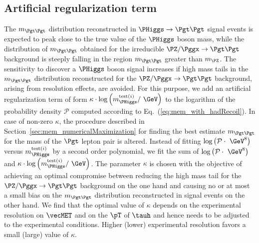 \subsection{Artificial regularization term}
\label{sec:mem_logM}

The $m_{\Pgt\Pgt}$ distribution reconstructed in $\PHiggs \to \Pgt\Pgt$ signal events is expected to peak close to the true value of the $\PHiggs$ boson mass,
while the distribution of $m_{\Pgt\Pgt}$ obtained for the irreducible
$\PZ/\Pggx \to \Pgt\Pgt$ background is steeply falling in the region
$m_{\Pgt\Pgt}$ greater than $m_{\PZ}$.
The sensitivity to discover a $\PHiggs$ boson signal increases if high mass tails in the $m_{\Pgt\Pgt}$ distribution reconstructed 
for the $\PZ/\Pggx \to \Pgt\Pgt$ background, arising from resolution effects, are avoided.
For this purpose,
we add an artificial regularization term of form 
$\kappa \cdot \log \left( m_{\PHiggs}^{\textrm{test}(i)} / \mbox{~\GeV} \right)$ 
to the logarithm of the probability density $\mathcal{P}$
computed according to Eq.~(\ref{eq:mem_with_hadRecoil}).
In case of non-zero $\kappa$,
the procedure described in Section~\ref{sec:mem_numericalMaximization} for finding the best estimate $m_{\Pgt\Pgt}$ for the mass of the $\Pgt$ lepton pair is altered.
Instead of fitting 
$\log \left( \mathcal{P} \cdot \mbox{~\GeV}^{8} \right)$ 
versus $m_{\PHiggs}^{\textrm{test}(i)}$ by a second order polynomial,
we fit the sum of $\log \left( \mathcal{P} \cdot \mbox{~\GeV}^{8} \right)$
and $\kappa \cdot \log \left( m_{\PHiggs}^{\textrm{test}(i)} / \mbox{~\GeV} \right)$.
The parameter $\kappa$ is chosen with the objective of achieving an
optimal compromise between reducing the high mass tail for the
$\PZ/\Pggx \to \Pgt\Pgt$ background on the one hand and 
causing no or at most a small bias on the $m_{\Pgt\Pgt}$ distribution
reconstructed in signal events on the other hand.
We find that the optimal value of $\kappa$ depends on the experimental
resolution on $\vecMET$ and on the $\pT$ of $\tauh$ and hence needs to be adjusted to the experimental conditions.
Higher (lower) experimental resolution favors a small (large) value of $\kappa$. 
